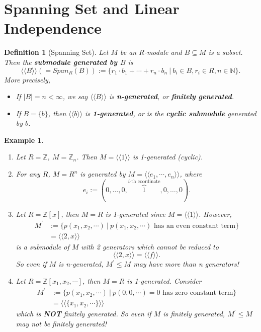 \documentclass[12pt]{amsbook}
\newtheorem{definition}[theorem]{Definition}
\newtheorem{example}[theorem]{Example}
\begin{document}
\section{Spanning Set and Linear Independence}
\begin{definition}[Spanning Set]
    Let $M$ be an $R$-module and $B \subseteq M$ is a subset. Then the {\bf submodule generated by $B$} is 
    $$\langle \langle B \rangle \rangle (=Span_{R}(B)):=\{ r_1 \cdot b_1+\cdots+r_n \cdot b_n \ |\ b_i \in B, r_i \in R, n \in \mathbb{N} \}.$$
    More precisely,
    \begin{itemize}
        \item If $\left| B\right|=n<\infty$, we say $\langle\langle B\rangle\rangle$ is {\bf n-generated}, or {\bf finitely generated}.
        \item If $B=\{b\}$, then $\langle\langle b\rangle\rangle$ is {\bf 1-generated}, or is the {\bf cyclic submodule} generated by $b$.
    \end{itemize}
\end{definition}

\begin{example}\label{eg-zxnotpid}
    \begin{enumerate}
        \item Let $R=\mathbb{Z}$, $M=\mathbb{Z}_{n}$. Then $M=\langle\langle 1\rangle\rangle$ is 1-generated (cyclic).
        \item For any $R$, $M=R^{n}$ is generated by $M=\langle\langle e_1,\cdots ,e_n\rangle\rangle$, where 
        $$e_i := (0,\dots,0,\overbrace{1}^{i\text{-th coordinate}},0,\dots,0).$$
        \item Let $R=\mathbb{Z}[x]$, then $M=R$ is 1-generated since $M=\langle\langle 1\rangle\rangle$. However, 
        \begin{align*}
            M^{'}&:=\{p(x_1,x_2,\cdots)\ |\ p(x_1,x_2,\cdots) \text{ has an even constant term}\}\\
            &=\langle\langle 2,x\rangle\rangle
        \end{align*}
        is a submodule of $M$ with 2 generators which cannot be reduced to $$\langle\langle2,x\rangle\rangle=\langle\langle f\rangle\rangle.$$
        So even if $M$ is n-generated, $M^{'}\leq M$ may have more than n generators!
        \item Let $R=\mathbb{Z}[x_1,x_2,\cdots]$, then $M=R$ is 1-generated.
        Consider
        \begin{align*}
            M^{'}&:=\{p(x_1,x_2,\cdots)\ |\ p(0,0,\cdots)=0 \text{ has zero constant term}\}\\
            &=\langle\langle \{x_1,x_2,\cdots\}\rangle\rangle
        \end{align*}
        which is {\bf NOT} finitely generated. So even if $M$ is finitely generated, $M^{'}\leq M$ may not be finitely generated!
    \end{enumerate}
\end{example}
\end{document}
